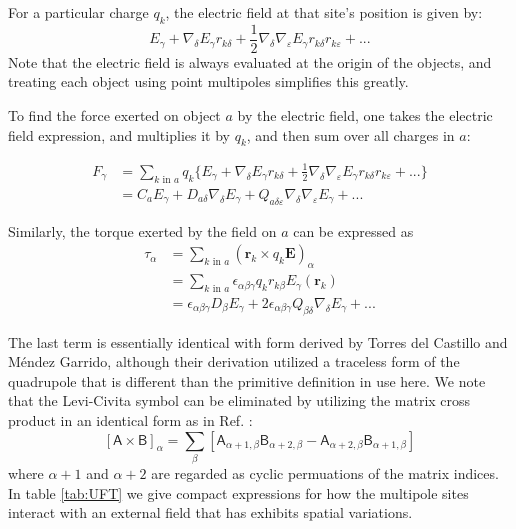 For a particular charge $q_k$, the electric field at that site's
position is given by:
\begin{equation}
E_\gamma + \nabla_\delta E_\gamma r_{k \delta} 
+ \frac {1}{2} \nabla_\delta \nabla_\varepsilon E_\gamma r_{k \delta}
r_{k \varepsilon} + ... 
\end{equation}
Note that the electric field is always evaluated at the origin of the
objects, and treating each object using point multipoles simplifies
this greatly.

To find the force exerted on object $a$ by the electric field, one
takes the electric field expression, and multiplies it by $q_k$, and
then sum over all charges in $a$:

\begin{align}
F_\gamma &=  \sum_{k \textrm{~in~} a} q_k \lbrace E_\gamma + \nabla_\delta E_\gamma r_{k \delta} 
+ \frac {1}{2} \nabla_\delta \nabla_\varepsilon E_\gamma r_{k \delta}
r_{k \varepsilon} + ...  \rbrace  \\
 &= C_a E_\gamma + D_{a  \delta} \nabla_\delta E_\gamma 
+ Q_{a \delta \varepsilon} \nabla_\delta \nabla_\varepsilon E_\gamma +
... 
\end{align}

Similarly, the torque exerted by the field on $a$ can be expressed as
\begin{align}
\tau_\alpha &=  \sum_{k \textrm{~in~} a} (\mathbf r_k \times q_k \mathbf E)_\alpha \\
 & =  \sum_{k \textrm{~in~} a} \epsilon_{\alpha \beta \gamma} q_k
 r_{k\beta} E_\gamma(\mathbf r_k) \\
 & = \epsilon_{\alpha \beta \gamma} D_\beta E_\gamma 
+ 2 \epsilon_{\alpha \beta \gamma} Q_{\beta \delta} \nabla_\delta
E_\gamma + ...
\end{align}

The last term is essentially identical with form derived by Torres del
Castillo and M\'{e}ndez Garrido,\cite{Torres-del-Castillo:2006uo} although their derivation
utilized a traceless form of the quadrupole that is different than the
primitive definition in use here.  We note that the Levi-Civita symbol
can be eliminated by utilizing the matrix cross product in an
identical form as in Ref. :
\begin{equation}
\left[\mathsf{A} \times \mathsf{B}\right]_\alpha = \sum_\beta
\left[\mathsf{A}_{\alpha+1,\beta} \mathsf{B}_{\alpha+2,\beta}
  -\mathsf{A}_{\alpha+2,\beta} \mathsf{B}_{\alpha+1,\beta} 
\right]
\label{eq:matrixCross}
\end{equation}
where $\alpha+1$ and $\alpha+2$ are regarded as cyclic permuations of
the matrix indices.  In table \ref{tab:UFT} we give compact
expressions for how the multipole sites interact with an external
field that has exhibits spatial variations.

